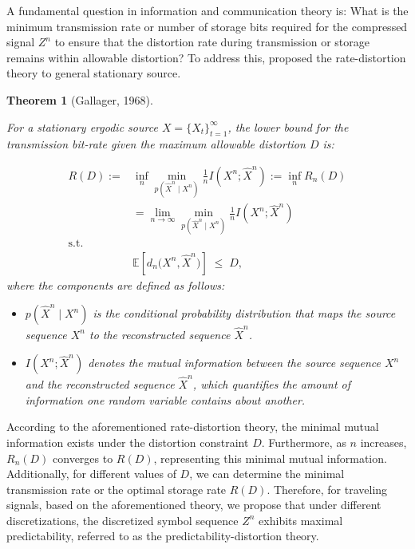 \documentclass[12pt,review,authoryear]{elsarticle}
\theoremstyle{upright}
\newtheorem{theorem}{Theorem}
\begin{document}
A fundamental question in information and communication theory is: What is the minimum transmission rate or number of storage bits required for the compressed signal $Z^n$ to ensure that the distortion rate during transmission or storage remains within allowable distortion? To address this, \citet{gallager1968information} proposed the rate-distortion theory to general stationary source.


\begin{theorem}[Gallager, 1968]\label{theorem Gallager}

For a stationary ergodic  source \( X=\{X_t\}_{t=1}^{ \infty} \), the lower bound for the transmission bit-rate given the maximum allowable distortion $D$ is: 

\begin{align*}
    R(D) :=& \inf_{n} \min_{p(\hat{X}^n \mid X^n)} \frac{1}{n} I(X^n; \hat{X}^n):=\inf_{n} R_n(D)\\
    &=\lim_{n \to \infty} \min_{p(\hat{X}^n \mid X^n)} \frac{1}{n} I(X^n; \hat{X}^n) 
     \\
     \text{s.t.}\\
    & \mathbb{E}\!\left[d_{n}\!\bigl(X^{n},\hat X^{n}\bigr)\right]\;\le\;D,%
\end{align*}
where the components are defined as follows:
\begin{itemize}
    \item \( p(\hat{X}^n \mid X^n) \) is the conditional probability distribution that maps the source sequence \( X^n \) to the reconstructed sequence \( \hat{X}^n \).
    \item \( I(X^n; \hat{X}^n) \) denotes the mutual information between the source sequence \( X^n \) and the reconstructed sequence \( \hat{X}^n \), which quantifies the amount of information one random variable contains about another. 

\end{itemize}
\end{theorem}
According to the aforementioned rate-distortion theory, the minimal mutual information exists under the distortion constraint \( D \). Furthermore, as \( n \) increases, \( R_n(D) \) converges to \( R(D) \), representing this minimal mutual information. Additionally, for different values of \( D \), we can determine the minimal transmission rate or the optimal storage rate  \( R(D) \). Therefore, for traveling signals, based on the aforementioned theory, we propose that under different discretizations, the discretized symbol sequence \( Z^n \) exhibits maximal predictability, referred to as the predictability-distortion theory.
\end{document}
